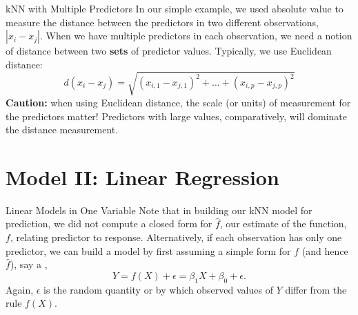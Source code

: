 \documentclass[12pt,t]{beamer}
\let\emph\relax %
\begin{document}
\begin{frame}{kNN with Multiple Predictors} 
In our simple example, we used absolute value to measure the distance between the predictors in two different observations, $|x_i - x_j|$. 
\vskip0.2cm
When we have multiple predictors in each observation, we need a notion of distance between two \textbf{sets} of predictor values. Typically, we use Euclidean distance:
\[
d(x_i - x_j) = \sqrt{(x_{i, 1} - x_{j, 1})^2 + \ldots + (x_{i, p} - x_{j, p})^2}
\]
\textbf{Caution:} when using Euclidean distance, the scale (or units) of measurement for the predictors matter! Predictors with large values, comparatively, will dominate the distance measurement.
\end{frame}


\section{Model II: Linear Regression}

\begin{frame}{Linear Models in One Variable} 
Note that in building our kNN model for prediction, we did not compute a closed form for $\widehat{f}$, our estimate of the function, $f$, relating predictor to response. 
\vskip0.4cm
Alternatively, if each observation has only one predictor, we can build a model by first assuming a simple form for $f$ (and hence $\widehat{f}$), say a \emph{linear form}, 
\[
Y = f(X) + \epsilon = \beta_1 X + \beta_0 + \epsilon.
\]
Again, $\epsilon$ is the random quantity or \emph{noise} by which observed values of $Y$ differ from the rule $f(X)$. 
\end{frame}
\end{document}
